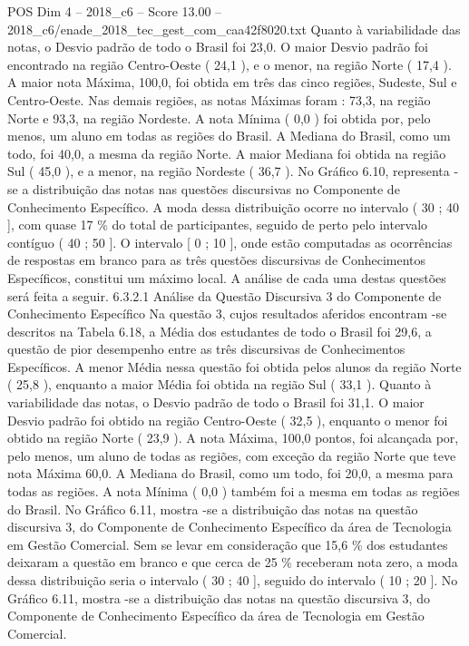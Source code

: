 \begin{textsample}{POS Dim 4 – 2018\_c6 – Score 13.00 – 2018\_c6/enade\_2018\_tec\_gest\_com\_caa42f8020.txt}
Quanto à variabilidade das notas, o Desvio padrão de todo o Brasil foi 23,0.
O maior Desvio padrão foi encontrado na região Centro-Oeste ( 24,1 ), e o menor, na região Norte ( 17,4 ).
A maior nota Máxima, 100,0, foi obtida em três das cinco regiões, Sudeste, Sul e Centro-Oeste.
Nas demais regiões, as notas Máximas foram : 73,3, na região Norte e 93,3, na região Nordeste.
A nota Mínima ( 0,0 ) foi obtida por, pelo menos, um aluno em todas as regiões do Brasil.
A Mediana do Brasil, como um todo, foi 40,0, a mesma da região Norte.
A maior Mediana foi obtida na região Sul ( 45,0 ), e a menor, na região Nordeste ( 36,7 ).
No Gráfico 6.10, representa -se a distribuição das notas nas questões discursivas no Componente de Conhecimento Específico.
A moda dessa distribuição ocorre no intervalo ( 30 ; 40 ], com quase 17 \% do total de participantes, seguido de perto pelo intervalo contíguo ( 40 ; 50 ].
O intervalo [ 0 ; 10 ], onde estão computadas as ocorrências de respostas em branco para as três questões discursivas de Conhecimentos Específicos, constitui um máximo local.
A análise de cada uma destas questões será feita a seguir. 6.3.2.1 Análise da Questão Discursiva 3 do Componente de Conhecimento Específico Na questão 3, cujos resultados aferidos encontram -se descritos na Tabela 6.18, a Média dos estudantes de todo o Brasil foi 29,6, a questão de pior desempenho entre as três discursivas de Conhecimentos Específicos.
A menor Média nessa questão foi obtida pelos alunos da região Norte ( 25,8 ), enquanto a maior Média foi obtida na região Sul ( 33,1 ).
Quanto à variabilidade das notas, o Desvio padrão de todo o Brasil foi 31,1.
O maior Desvio padrão foi obtido na região Centro-Oeste ( 32,5 ), enquanto o menor foi obtido na região Norte ( 23,9 ).
A nota Máxima, 100,0 pontos, foi alcançada por, pelo menos, um aluno de todas as regiões, com exceção da região Norte que teve nota Máxima 60,0.
A Mediana do Brasil, como um todo, foi 20,0, a mesma para todas as regiões.
A nota Mínima ( 0,0 ) também foi a mesma em todas as regiões do Brasil.
No Gráfico 6.11, mostra -se a distribuição das notas na questão discursiva 3, do Componente de Conhecimento Específico da área de Tecnologia em Gestão Comercial.
Sem se levar em consideração que 15,6 \% dos estudantes deixaram a questão em branco e que cerca de 25 \% receberam nota zero, a moda dessa distribuição seria o intervalo ( 30 ; 40 ], seguido do intervalo ( 10 ; 20 ].
No Gráfico 6.11, mostra -se a distribuição das notas na questão discursiva 3, do Componente de Conhecimento Específico da área de Tecnologia em Gestão Comercial.

\end{textsample}
